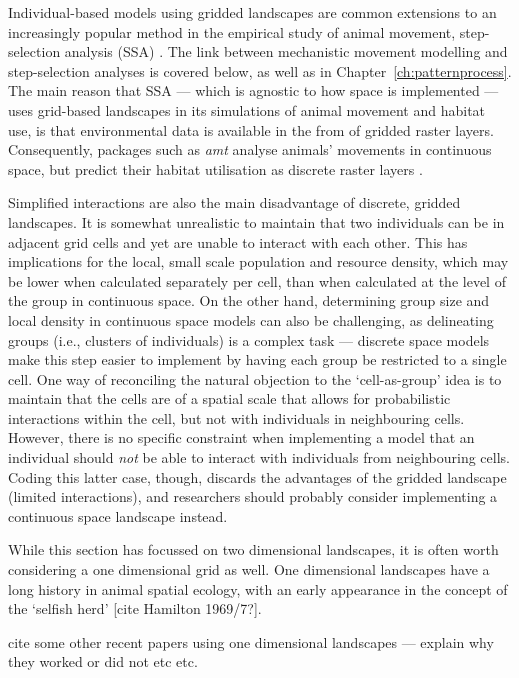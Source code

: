 Individual-based models using gridded landscapes are common extensions to an increasingly popular method in the empirical study of animal movement, step-selection analysis (SSA) \citep{fortin2005,avgar2016,fieberg2021}.
The link between mechanistic movement modelling and step-selection analyses is covered below, as well as in Chapter~\ref{ch:patternprocess}.
The main reason that SSA --- which is agnostic to how space is implemented --- uses grid-based landscapes in its simulations of animal movement and habitat use, is that environmental data is available in the from of gridded raster layers.
Consequently, packages such as \emph{amt} analyse animals' movements in continuous space, but predict their habitat utilisation as discrete raster layers \citep{signer2017,signer2019}.

Simplified interactions are also the main disadvantage of discrete, gridded landscapes.
It is somewhat unrealistic to maintain that two individuals can be in adjacent grid cells and yet are unable to interact with each other.
This has implications for the local, small scale population and resource density, which may be lower when calculated separately per cell, than when calculated at the level of the group in continuous space.
On the other hand, determining group size and local density in continuous space models can also be challenging, as delineating groups (i.e., clusters of individuals) is a complex task --- discrete space models make this step easier to implement by having each group be restricted to a single cell.
One way of reconciling the natural objection to the `cell-as-group' idea is to maintain that the cells are of a spatial scale that allows for probabilistic interactions within the cell, but not with individuals in neighbouring cells.
However, there is no specific constraint when implementing a model that an individual should \emph{not} be able to interact with individuals from neighbouring cells.
Coding this latter case, though, discards the advantages of the gridded landscape (limited interactions), and researchers should probably consider implementing a continuous space landscape instead.

While this section has focussed on two dimensional landscapes, it is often worth considering a one dimensional grid as well.
One dimensional landscapes have a long history in animal spatial ecology, with an early appearance in the concept of the `selfish herd' [cite Hamilton 1969/7?].

cite some other recent papers using one dimensional landscapes --- explain why they worked or did not etc etc.


